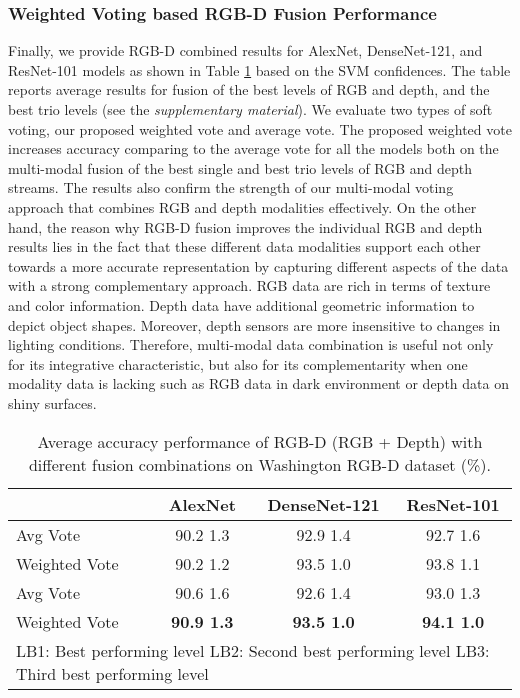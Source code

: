 \subsubsection{Weighted Voting based RGB-D Fusion Performance} \label{sec.exp.ma.weightedFusion}
Finally, we provide RGB-D combined results for AlexNet, DenseNet-121, and ResNet-101 models as shown in Table \ref{table:rgbdFusions} based on the SVM confidences. The table reports average results for fusion of the best levels of RGB and depth, and the best trio levels (see the \textit{supplementary material}). We evaluate two types of soft voting, our proposed weighted vote and average vote. The proposed weighted vote increases accuracy comparing to the average vote for all the models both on the multi-modal fusion of the best single and best trio levels of RGB and depth streams. The results also confirm the strength of our multi-modal voting approach that combines RGB and depth modalities effectively. On the other hand, the reason why RGB-D fusion improves the individual RGB and depth results lies in the fact that these different data modalities support each other towards a more accurate representation by capturing different aspects of the data with a strong complementary approach. RGB data are rich in terms of texture and color information. Depth data have additional geometric information to depict object shapes. Moreover, depth sensors are more insensitive to changes in lighting conditions. Therefore, multi-modal data combination is useful not only for its integrative characteristic, but also for its complementarity when one modality data is lacking such as RGB data in dark environment or depth data on shiny surfaces.
\begin{table}[!h]
	\caption{Average accuracy performance of RGB-D (RGB + Depth) with different fusion combinations on Washington RGB-D dataset (\%).}  
	\label{table:rgbdFusions}    
	\centering
	\setlength{\tabcolsep}{0.9em} \def\arraystretch{1.2}
	\begin{adjustbox}{width=\columnwidth}
		\begin{tabular}{llccc}
			\hline
			&								       																				& AlexNet 						  & DenseNet-121 					& ResNet-101 				\\ \hline \hline
			Avg Vote 		&           		& 90.2  1.3        	  & 92.9  1.4           	& 92.7  1.6         \\
			Weighted Vote 	&      			   	& 90.2  1.2        	  & 93.5  1.0          	& 93.8  1.1          \\
			Avg Vote 		&   & 90.6  1.6        	  & 92.6  1.4          	& 93.0  1.3           \\
			Weighted Vote 	&   & \textbf{90.9  1.3}    & \textbf{93.5  1.0}    & \textbf{94.1  1.0} 	 \\ \hline
			\multicolumn{5}{l}{LB1: Best performing level \quad LB2: Second best performing level \quad LB3: Third best performing level}
		\end{tabular}
	\end{adjustbox}
\end{table}
 
